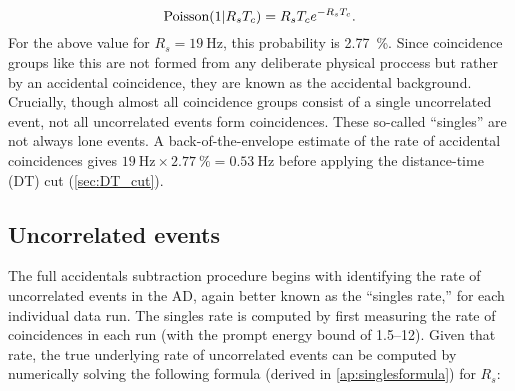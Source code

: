 \begin{equation}
    \text{Poisson}(1\vert R_sT_c) = R_sT_c e^{-R_sT_c}.
\end{equation}
For the above value for $R_s=\SI{19}{\hertz}$, this probability is \SI{2.77}{\percent}.
Since  coincidence groups like this are not formed from any
deliberate physical proccess but rather by an accidental coincidence,
they are known as the accidental background.
Crucially, though almost all  coincidence groups
consist of a single uncorrelated event,
not all uncorrelated events form  coincidences.
These so-called ``singles'' are not always lone events.
A back-of-the-envelope estimate of the rate of accidental coincidences gives
$\SI{19}{\hertz}\times\SI{2.77}{\percent}=\SI{0.53}{\hertz}$
before applying the distance-time (DT) cut (\cref{sec:DT_cut}).

\subsection{Uncorrelated events}
\label{subsec:singles}

The full accidentals subtraction procedure begins with identifying
the rate of uncorrelated events in the AD, again better known
as the ``singles rate,'' for each individual data run.
The singles rate is computed by first measuring the rate of
 coincidences in each run
(with the prompt energy bound of \SIrange{1.5}{12}{\mev}).
Given that rate, the true underlying rate of uncorrelated events can be
computed by numerically solving the following formula
(derived in \cref{ap:singlesformula}) for $R_s$:


